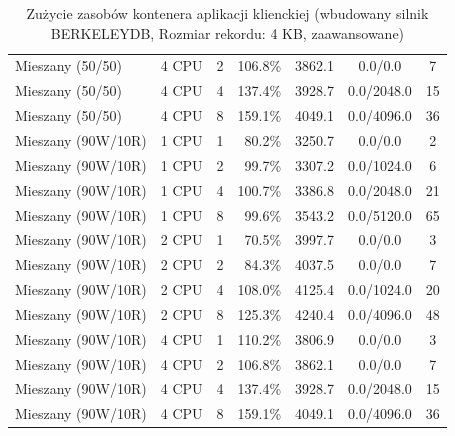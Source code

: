 \begin{table}[ht]
{\begin{tabular}{llcrrcc}
Mieszany (50/50) & 4 CPU & 2 & 106.8\% & 3862.1 & 0.0/0.0 & 7 \\
Mieszany (50/50) & 4 CPU & 4 & 137.4\% & 3928.7 & 0.0/2048.0 & 15 \\
Mieszany (50/50) & 4 CPU & 8 & 159.1\% & 4049.1 & 0.0/4096.0 & 36 \\
Mieszany (90W/10R) & 1 CPU & 1 & 80.2\% & 3250.7 & 0.0/0.0 & 2 \\
Mieszany (90W/10R) & 1 CPU & 2 & 99.7\% & 3307.2 & 0.0/1024.0 & 6 \\
Mieszany (90W/10R) & 1 CPU & 4 & 100.7\% & 3386.8 & 0.0/2048.0 & 21 \\
Mieszany (90W/10R) & 1 CPU & 8 & 99.6\% & 3543.2 & 0.0/5120.0 & 65 \\
Mieszany (90W/10R) & 2 CPU & 1 & 70.5\% & 3997.7 & 0.0/0.0 & 3 \\
Mieszany (90W/10R) & 2 CPU & 2 & 84.3\% & 4037.5 & 0.0/0.0 & 7 \\
Mieszany (90W/10R) & 2 CPU & 4 & 108.0\% & 4125.4 & 0.0/1024.0 & 20 \\
Mieszany (90W/10R) & 2 CPU & 8 & 125.3\% & 4240.4 & 0.0/4096.0 & 48 \\
Mieszany (90W/10R) & 4 CPU & 1 & 110.2\% & 3806.9 & 0.0/0.0 & 3 \\
Mieszany (90W/10R) & 4 CPU & 2 & 106.8\% & 3862.1 & 0.0/0.0 & 7 \\
Mieszany (90W/10R) & 4 CPU & 4 & 137.4\% & 3928.7 & 0.0/2048.0 & 15 \\
Mieszany (90W/10R) & 4 CPU & 8 & 159.1\% & 4049.1 & 0.0/4096.0 & 36 \\
\bottomrule
\end{tabular}%
}
\caption{Zużycie zasobów kontenera aplikacji klienckiej (wbudowany silnik BERKELEYDB, Rozmiar rekordu: 4 KB, zaawansowane)}
\label{tab:resources_berkeleydb_medium_0}
\end{table}
